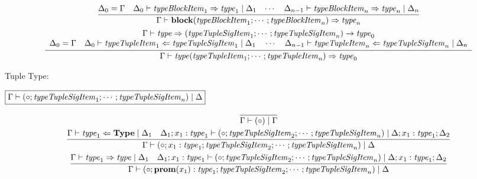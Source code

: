 \begin{gather*}
  \\
  \infer{\Gamma \vdash \mathbf{block}(\mathit{typeBlockItem}_1; \cdots; \mathit{typeBlockItem}_n) \Rightarrow \mathit{type}_n}{
    \Delta_0 = \Gamma
    &
    \Delta_0 \vdash \mathit{typeBlockItem}_1 \Rightarrow \mathit{type}_1 \mid \Delta_1
    &
    \cdots
    &
    \Delta_{n - 1} \vdash \mathit{typeBlockItem}_n \Rightarrow \mathit{type}_n \mid \Delta_n
  }
  \\
  \infer{\Gamma \vdash \mathit{type}(\mathit{typeTupleItem}_1; \cdots; \mathit{typeTupleItem}_n) \Rightarrow \mathit{type}_0}{
    \begin{array}{c}
      \Gamma \vdash \mathit{type} \Rightarrow (\mathit{typeTupleSigItem}_1; \cdots; \mathit{typeTupleSigItem}_n) \rightarrow \mathit{type}_0
      \\
      \Delta_0 = \Gamma
      \hspace{1em}
      \Delta_0 \vdash \mathit{typeTupleItem}_1 \Leftarrow \mathit{typeTupleSigItem}_1 \mid \Delta_1
      \hspace{1em}
      \cdots
      \hspace{1em}
      \Delta_{n - 1} \vdash \mathit{typeTupleItem}_n \Leftarrow \mathit{typeTupleSigItem}_n \mid \Delta_n
    \end{array}
  }
\end{gather*}

Tuple Type:

$\fbox{$\Gamma \vdash (\circ; \mathit{typeTupleSigItem}_1; \cdots; \mathit{typeTupleSigItem}_n) \mid \Delta$}$

\begin{gather*}
  \infer{\Gamma \vdash (\circ) \mid \Gamma}{}
  \\
  \infer{\Gamma \vdash (\circ; x_1: \mathit{type}_1; \mathit{typeTupleSigItem}_2; \cdots; \mathit{typeTupleSigItem}_n) \mid \Delta}{
    \Gamma \vdash \mathit{type}_1 \Leftarrow \mathbf{Type} \mid \Delta_1
    &
    \Delta_1; x_1: \mathit{type}_1 \vdash (\circ; \mathit{typeTupleSigItem}_2; \cdots; \mathit{typeTupleSigItem}_n) \mid \Delta; x_1: \mathit{type}_1; \Delta_2
  }
  \\
  \infer{\Gamma \vdash (\circ; \mathbf{prom}(x_1): \mathit{type}_1; \mathit{typeTupleSigItem}_2; \cdots; \mathit{typeTupleSigItem}_n) \mid \Delta}{
    \Gamma \vdash \mathit{type}_1 \Rightarrow \mathit{type} \mid \Delta_1
    &
    \Delta_1; x_1: \mathit{type}_1 \vdash (\circ; \mathit{typeTupleSigItem}_2; \cdots; \mathit{typeTupleSigItem}_n) \mid \Delta; x_1: \mathit{type}_1; \Delta_2
  }
\end{gather*}

